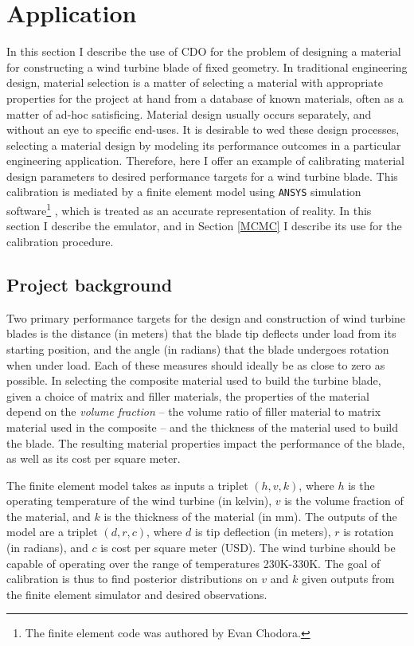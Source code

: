 \documentclass{article}
\begin{document}
\section{Application}\label{application}

In this section I describe the use of CDO for the problem of designing a material for constructing a wind turbine blade of fixed geometry. In traditional engineering design, material selection is a matter of selecting a material with appropriate properties for the project at hand from a database of known materials, often as a matter of ad-hoc satisficing. Material design usually occurs separately, and without an eye to specific end-uses. It is desirable to wed these design processes, selecting a material design by modeling its performance outcomes in a particular engineering application. Therefore, here I offer an example of calibrating material design parameters to desired performance targets for a wind turbine blade. This calibration is mediated by a finite element model using \texttt{ANSYS} simulation software\footnote{
The finite element code was authored by Evan Chodora.
}
, which is treated as an accurate representation of reality. In this section I describe the emulator, and in Section \ref{MCMC} I describe its use for the calibration procedure.

\subsection{Project background}

Two primary performance targets for the design and construction of wind turbine blades is the distance (in meters) that the blade tip deflects under load from its starting position, and the angle (in radians) that the blade undergoes rotation when under load. 
Each of these measures should ideally be as close to zero as possible.
In selecting the composite material used to build the turbine blade, given a choice of matrix and filler materials, the properties of the material depend on the \textit{volume fraction} -- the volume ratio of filler material to matrix material used in the composite -- and the thickness of the material used to build the blade. 
The resulting material properties impact the performance of the blade, as well as its cost per square meter. 

The finite element model takes as inputs a triplet $(h,v,k)$, where $h$ is the operating temperature of the wind turbine (in kelvin), $v$ is the volume fraction of the material, and $k$ is the thickness of the material (in mm). 
The outputs of the model are a triplet $(d,r,c)$, where $d$ is tip deflection (in meters), $r$ is rotation (in radians), and $c$ is cost per square meter (USD). 
The wind turbine should be capable of operating over the range of temperatures 230K-330K. The goal of calibration is thus to find posterior distributions on $v$ and $k$ given outputs from the finite element simulator and desired observations.
\end{document}
